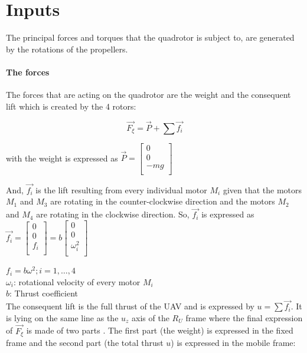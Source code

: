 \documentclass{thesisreport}
\begin{document}
\newpage


\section{Inputs}

The principal forces and torques that the quadrotor is subject to, are generated by the rotations of the propellers. 

\paragraph{The forces} The forces that are acting on the quadrotor are the weight and the consequent lift which is created by the 4 rotors:

\begin{equation}
\overrightarrow{F_{\xi}}= \overrightarrow{P} + \sum \overrightarrow{f_i}
\end{equation} 

with the weight is expressed as 
$ \overrightarrow{P}= \begin{bmatrix}
0 \\ 
0 \\
-mg \\
\end{bmatrix}$

And, $\overrightarrow{f_{i}}$ is the lift resulting from every individual motor $M_i$ given that the motors $M_1$ and $M_3$ are rotating in the counter-clockwise direction and the motors $M_2$ and $M_4$ are rotating in the clockwise direction. So, $\overrightarrow{f_i}$ is expressed as $\overrightarrow{f_i}=\begin{bmatrix}
0 \\ 
0 \\
f_i \\
\end{bmatrix}=b \begin{bmatrix}
0 \\ 
0 \\
\omega_i^2 \\
\end{bmatrix} $  

$f_i = b \omega^2; i=1,\ldots,4$\\
$\omega_i$: rotational velocity of every motor $M_i$\\
$b$: Thrust coefficient\\

The consequent lift is the full thrust of the UAV and is expressed by $u=\sum \overrightarrow{f_i}$. It is lying on the same line as the $u_z$ axis of the $R_U$ frame where the final expression of $\overrightarrow{F_{\xi}}$ is made of two parts . The first part (the weight)  is expressed in the fixed frame and the second part (the total thrust $u$) is expressed in the mobile frame: 
\end{document}
